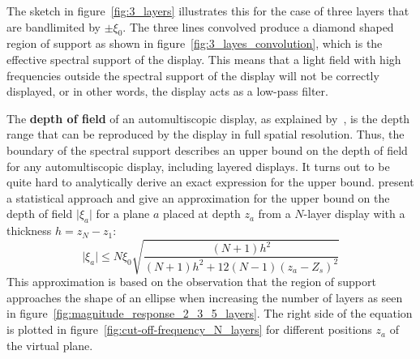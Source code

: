 The sketch in figure~\ref{fig:3_layers} illustrates this for the case of three layers that are bandlimited by $\pm \xi_0$.
The three lines convolved produce a diamond shaped region of support as shown in figure~\ref{fig:3_layes_convolution}, which is the effective spectral support of the display.
This means that a light field with high frequencies outside the spectral support of the display will not be correctly displayed, or in other words, the display acts as a low-pass filter.

The \textbf{depth of field} of an automultiscopic display, as explained by~\cite{Antialiasingfor3DDisplays}, is the depth range that can be reproduced by the display in full spatial resolution.
Thus, the boundary of the spectral support describes an upper bound on the depth of field for any automultiscopic display, including layered displays.
It turns out to be quite hard to analytically derive an exact expression for the upper bound.
\cite{WetzsteinTomo} present a statistical approach and give an approximation for the upper bound on the depth of field $\lvert \xi_a \rvert$ for a plane $a$ placed at depth $z_a$ from a \mbox{$N$-layer} display with a thickness $h = z_N - z_1$:
\begin{equation}\label{eq:approx_upper_bound_spatial_cut_off}
	\lvert \xi_a \rvert \leq N \xi_0 \sqrt{ \frac{(N + 1) h^2}{(N + 1) h^2 + 12(N - 1)(z_a - Z_s)^2} }
\end{equation}
This approximation is based on the observation that the region of support approaches the shape of an ellipse when increasing the number of layers as seen in figure~\ref{fig:magnitude_response_2_3_5_layers}.
The right side of the equation is plotted in figure~\ref{fig:cut-off-frequency_N_layers} for different positions $z_a$ of the virtual plane.
